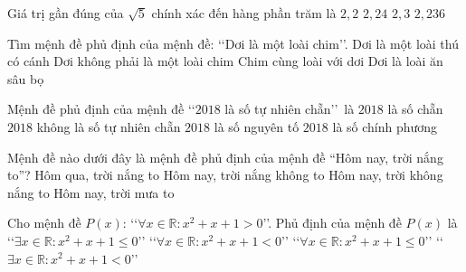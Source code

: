 \begin{ex}%
	Giá trị gần đúng của $\sqrt{5}$ chính  xác đến hàng phần trăm là
	 \choice
		{$2{,}2$ } 
		{\True  $2{,}24$}
		 {$2{,}3$}
		{$2{,}236$} 
\end{ex}

\begin{ex}%
	Tìm mệnh đề phủ  định của mệnh đề: \lq\lq Dơi là một loài chim\rq\rq.
	\choice 
		{Dơi là một loài  thú có cánh}
		{\True  Dơi không phải là một loài chim}
		 {Chim cùng loài với dơi}
		 {Dơi là loài ăn sâu bọ}
\end{ex}

\begin{ex}%
	Mệnh đề phủ định của mệnh đề \lq \lq $2018$ là số tự nhiên chẵn\rq \rq \, là 
	\choice 
		{$  2018 $ là số chẵn}
		{\True $ 2018 $ không là  số tự nhiên chẵn}
		{$ 2018  $ là số nguyên tố}
		{$ 2018 $ là số chính  phương}
\end{ex}

\begin{ex}%
	Mệnh đề nào dưới đây là  mệnh đề phủ định của mệnh đề “Hôm nay, trời nắng to”?
	 \choice
		{Hôm  qua, trời nắng to}
		 {Hôm nay, trời nắng không to}
		{\True Hôm nay,  trời không nắng to}
		 {Hôm nay, trời mưa to}
\end{ex}

\begin{ex}%
	 Cho mệnh đề $P(x)$: \lq\lq $\forall x \in \mathbb{R} : x^{2}+x+1>0$\rq\rq. Phủ định của mệnh đề $P(x)$ là
	\choice 
		{\True \lq\lq$\exists x  \in \mathbb{R} : x^{2}+x+1 \leq 0$\rq\rq}
		{\lq\lq$\forall x \in  \mathbb{R} : x^{2}+x+1<0$\rq\rq}
		 {\lq\lq$\forall x \in \mathbb{R} : x^{2}+x+1 \leq 0$\rq\rq}
		{\lq\lq$\exists x \in  \mathbb{R} : x^{2}+x+1<0$\rq\rq}
\end{ex}

